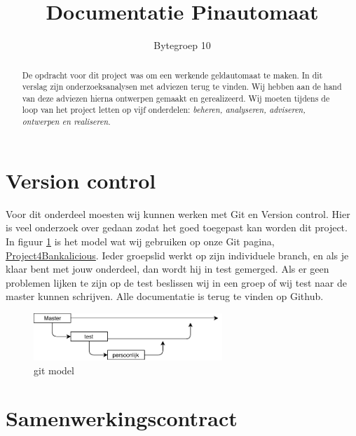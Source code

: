 \documentclass{article}
\begin{document}
\title{Documentatie Pinautomaat}
\author{Bytegroep 10}

\maketitle

\begin{abstract}

De opdracht voor dit project was om een werkende geldautomaat te maken.
In dit verslag zijn onderzoeksanalysen met adviezen terug te vinden.
Wij hebben aan de hand van deze adviezen hierna ontwerpen gemaakt en gerealizeerd.
Wij moeten tijdens de loop van het project letten op vijf onderdelen: \emph{beheren, analyseren, adviseren, ontwerpen en realiseren.}

\end{abstract}

\newpage

\tableofcontents

\newpage

\section{Version control}

Voor dit onderdeel moesten wij kunnen werken met Git en Version control.
Hier is veel onderzoek over gedaan zodat het goed toegepast kan worden dit project.
In figuur \ref{fig: git model} is het model wat wij gebruiken op onze Git pagina, \href{https://github.com/Gewad/Project4Bankalicious}{Project4Bankalicious}.
Ieder groepslid werkt op zijn individuele branch, en als je klaar bent met jouw onderdeel, dan wordt hij in test gemerged.
Als er geen problemen lijken te zijn op de test beslissen wij in een groep of wij test naar de master kunnen schrijven.
Alle documentatie is terug te vinden op Github.

\begin{figure}[!h]
        \centering
        \includegraphics[height=0.7in]{git.pdf}
        \caption{git model}
        \label{fig: git model}
\end{figure}

\section{Samenwerkingscontract}
\label{chap:Samenwerkingscontract}
\end{document}
